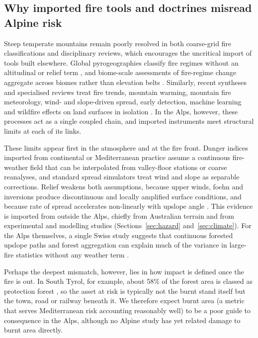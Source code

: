 \documentclass[11pt,a4paper]{article}
\begin{document}
\subsection{Why imported fire tools and doctrines misread Alpine risk}

Steep temperate mountains remain poorly resolved in both coarse-grid fire classifications and disciplinary reviews, which encourages the uncritical import of tools built elsewhere. Global pyrogeographies classify fire regimes without an altitudinal or relief term \citep{archibald_defining_2013, pereira_wild_2022}, and biome-scale assessments of fire-regime change aggregate across biomes rather than elevation belts \citep{sayedi_assessing_2024}. Similarly, recent syntheses and specialised reviews treat fire trends, mountain warming, mountain fire meteorology, wind- and slope-driven spread, early detection, machine learning and wildfire effects on land surfaces in isolation \citep{jones_global_2022, pepin_climate_2022, sharples_overview_2009, hayajneh_wind_2026, mohapatra_early_2022, jain_review_2020, or_review_2023}. In the Alps, however, these processes act as a single coupled chain, and imported instruments meet structural limits at each of its links.

These limits appear first in the atmosphere and at the fire front. Danger indices imported from continental or Mediterranean practice assume a continuous fire-weather field that can be interpolated from valley-floor stations or coarse reanalyses, and standard spread simulators treat wind and slope as separable corrections. Relief weakens both assumptions, because upper winds, foehn and inversions produce discontinuous and locally amplified surface conditions, and because rate of spread accelerates non-linearly with upslope angle \citep{sharples_overview_2009, ozaki_impact_2022, hayajneh_wind_2026}. This evidence is imported from outside the Alps, chiefly from Australian terrain and from experimental and modelling studies (Sections~\ref{sec:hazard} and~\ref{sec:climate}). For the Alps themselves, a single Swiss study suggests that continuous forested upslope paths and forest aggregation can explain much of the variance in large-fire statistics without any weather term \citep{conedera_linking_2024}.

Perhaps the deepest mismatch, however, lies in how impact is defined once the fire is out. In South Tyrol, for example, about 58\% of the forest area is classed as protection forest \citep{hillebrand_contrasting_2023}, so the asset at risk is typically not the burnt stand itself but the town, road or railway beneath it. We therefore expect burnt area (a metric that serves Mediterranean risk accounting reasonably well) to be a poor guide to consequence in the Alps, although no Alpine study has yet related damage to burnt area directly.
\end{document}
